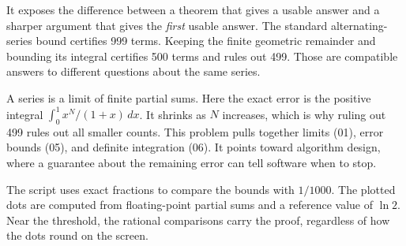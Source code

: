It exposes the difference between a theorem that gives a usable answer and a sharper argument that gives the \emph{first} usable answer. The standard alternating-series bound certifies 999 terms. Keeping the finite geometric remainder and bounding its integral certifies 500 terms and rules out 499. Those are compatible answers to different questions about the same series.

A series is a limit of finite partial sums. Here the exact error is the positive integral \mbox{\(\int_0^1 x^N/(1+x)\,dx\)}. It shrinks as \(N\) increases, which is why ruling out 499 rules out all smaller counts. This problem pulls together limits (01), error bounds (05), and definite integration (06). It points toward algorithm design, where a guarantee about the remaining error can tell software when to stop.

The script uses exact fractions to compare the bounds with \(1/1000\). The plotted dots are computed from floating-point partial sums and a reference value of \(\ln 2\). Near the threshold, the rational comparisons carry the proof, regardless of how the dots round on the screen.

